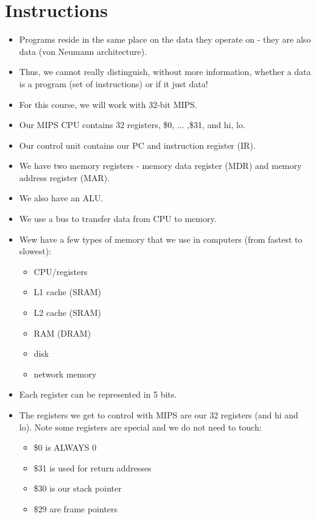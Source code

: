 \documentclass[12pt]{article}
\begin{document}
\section{Instructions}
\begin{itemize}
    \item Programs reside in the same place on the data they operate on - they are also data (von Neumann architecture).
    \item Thus, we cannot really distinguish, without more information, whether a data is a program (set of instructions) or if it just data!
    \item For this course, we will work with 32-bit MIPS.
    \item Our MIPS CPU contains 32 registers, \$0, ... ,\$31, and hi, lo.
    \item Our control unit contains our PC and instruction register (IR).
    \item We have two memory registers - memory data register (MDR) and memory address register (MAR).
    \item We also have an ALU.
    \item We use a bus to transfer data from CPU to memory.
    \item Wew have a few types of memory that we use in computers (from fastest to slowest):
        \begin{itemize}
            \item CPU/registers
            \item L1 cache (SRAM)
            \item L2 cache (SRAM)
            \item RAM (DRAM)
            \item disk
            \item network memory
        \end{itemize}
    \item Each register can be represented in 5 bits.
    \item The registers we get to control with MIPS are our 32 registers (and hi and lo).  Note some registers are special and we do not need to touch:
        \begin{itemize}
            \item \$0 is ALWAYS 0
            \item \$31 is used for return addresses
            \item \$30 is our stack pointer
            \item \$29 are frame pointers
        \end{itemize}

\end{itemize}
\end{document}
